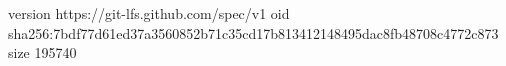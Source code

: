 version https://git-lfs.github.com/spec/v1
oid sha256:7bdf77d61ed37a3560852b71c35cd17b813412148495dac8fb48708c4772c873
size 195740
